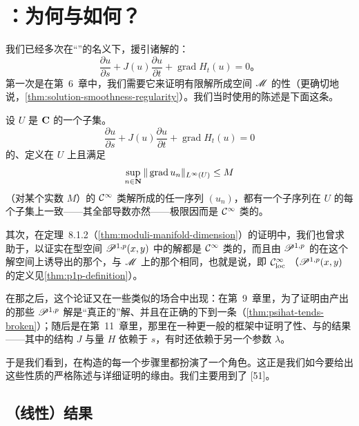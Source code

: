 
\section{\trEllipticRegularity：为何与如何？}
\label{sec:why-how}

我们已经多次在“\trEllipticRegularity”的名义下，援引\trFloerEquation{}诸解的\trRegularity：
\[
\frac{\partial u}{\partial s}+J(u)\frac{\partial u}{\partial t}+\operatorname{grad}H_{t}(u)=0\text{。}
\]
第一次是在第~6~章中，我们需要它来证明有限\trEnergy{}解所成空间 $\mathscr{M}$ 的\trCompact{}性（更确切地说，\cref{thm:solution-smoothness-regularity}）。我们当时使用的陈述是下面这条。

\begin{lemma}[\trEllipticRegularity]\label{thm:elliptic-regularity-lemma}
设 $U$ 是 $\mathbf{C}$ 的一个\trOpen{}子集。\trFloerEquation
\[
\frac{\partial u}{\partial s}+J(u)\frac{\partial u}{\partial t}+\operatorname{grad}H_{t}(u)=0
\]
的、定义在 $U$ 上且满足
\[
\sup_{n\in\mathbf{N}}\|\operatorname{grad}u_{n}\|_{L^{\infty}(U)}\le M
\]
（对某个实数 $M$）的 $\mathcal{C}^{\infty}$ 类解所成的任一序列 $(u_{n})$，都有一个子序列在 $U$ 的每个\trCompact{}子集上一致\trConvergence{}——其全部导数亦然——极限因而是 $\mathcal{C}^{\infty}$ 类的。
\end{lemma}

其次，在\trTransversality{}定理~8.1.2（\cref{thm:moduli-manifold-dimension}）的证明中，我们也曾求助于\trEllipticRegularity，以证实\trFloerEquation{}在\trSobolev{}型空间 $\mathscr{P}^{1,p}(x,y)$ 中的解都是 $\mathcal{C}^{\infty}$ 类的，而且由 $\mathscr{P}^{1,p}$ 的\trTopology{}在这个解空间上诱导出的那个\trTopology，与 $\mathscr{M}$ 上的那个相同，也就是说，即 $\mathcal{C}^{\infty}_{\mathrm{loc}}$ \trTopology（$\mathscr{P}^{1,p}(x,y)$ 的定义见\cref{thm:p1p-definition}）。

在那之后，这个\trEllipticRegularity{}论证又在一些类似的场合中出现：在第~9~章里，为了证明由\trGluing{}产出的那些 $\mathscr{P}^{1,p}$ 解是“真正的”解、并且在正确的\trTopology{}下\trConvergence{}到一条\trBrokenTrajectory（\cref{thm:psihat-tends-broken}）；随后是在第~11~章里，那里在一种更一般的框架中证明了\trCompact{}性、\trTransversality{}与\trGluing{}的结果——其中的\trAlmostComplex{}结构 $J$ 与\trHamiltonian{}量 $H$ 依赖于 $s$，有时还依赖于另一个参数 $\lambda$。

于是我们看到，\trEllipticRegularity{}在\trFloerHomology{}构造的每一个步骤里都扮演了一个角色。这正是我们如今要给出这些性质的严格陈述与详细证明的缘由。我们主要用到了 [51]。

\subsection{（线性）\trEllipticRegularity{}结果}

